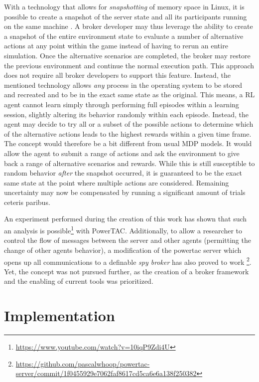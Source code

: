 With a technology that allows for \emph{snapshotting} of memory space in Linux, it is possible to create a snapshot of
the server state and all its participants running on the same machine \citep{criu}. A broker developer may thus leverage the
ability to create a snapshot of the entire environment state to evaluate a number of alternative actions at any point
within the game instead of having to rerun an entire simulation. Once the alternative scenarios are completed, the
broker may restore the previous environment and continue the normal execution path. This approach does not require all broker developers to
support this feature. Instead, the mentioned technology allows \emph{any} process in the operating
system to be stored and recreated and to be in the exact same state as the original. This means, a \ac{RL} agent cannot learn simply
through performing full episodes within a learning session, slightly altering its behavior randomly within each episode.
Instead, the agent may decide to try all or a subset of the possible actions to determine which of
the alternative actions leads to the highest rewards within a given time frame. The concept would therefore be a bit
different from usual \ac{MDP} models. It would allow the agent to submit a range of actions and ask the environment to
give back a range of alternative scenarios and rewards. While this is still susceptible to random behavior \emph{after}
the snapshot occurred, it is guaranteed to be the exact same state at the point where multiple actions are considered.
Remaining uncertainty may now be compensated by running a significant amount of trials ceteris paribus.

An experiment performed during the creation of this work has shown that such an analysis is
possible\footnote{\url{https://www.youtube.com/watch?v=10iqP9Zdi4U}} with \ac{PowerTAC}. Additionally, to allow a
researcher to control the flow of messages between the server and other agents (permitting the change of other agents
behavior), a modification of the powertac server which opens up all communications to a definable \emph{spy broker} has
also proved to work
\footnote{\url{https://github.com/pascalwhoop/powertac-server/commit/1f0455929e7062faf8617cd5ca6e6a138f250382}}. Yet,
the concept was not pursued further, as the creation of a broker framework and the enabling of current tools was
prioritized.

\section{Implementation }
\label{sec:implementation}

